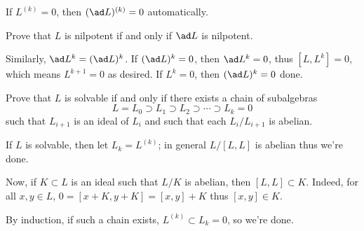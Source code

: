 \documentclass[11pt, headheight=30pt]{scrartcl}
\begin{document}
If $L^{(k)} = 0$, then $(\ad L)^{(k)} = 0$ automatically.

\begin{prob}
    Prove that $L$ is nilpotent if and only if $\ad L$ is nilpotent.
\end{prob}
Similarly, $\ad L^k = (\ad L)^k$. If $(\ad L)^k = 0$, then $\ad L^k = 0$,
thus $[L, L^k] = 0$, which means $L^{k + 1} = 0$ as desired.
If $L^k = 0$, then $(\ad L)^k = 0$ done.

\begin{prob}
    Prove that $L$ is solvable if and only if there exists a chain of subalgebras
    \[
        L = L_0 \supset L_1 \supset L_2 \supset \cdots \supset L_k = 0
    \]
    such that $L_{i+1}$ is an ideal of $L_i$ and such that each $L_i/L_{i+1}$ is abelian.
\end{prob}

If $L$ is solvable, then let $L_k = L^{(k)}$;
in general $L / [L,L]$ is abelian thus we're done.

Now, if $K\subset L$ is an ideal
such that $L / K$ is abelian, then $[L,L]\subset K$.
Indeed, for all $x,y\in L$,
$0 = [x + K, y + K] = [x,y] + K$ thus $[x,y]\in K$.

By induction, if such a chain exists, $L^{(k)}\subset L_k = 0$,
so we're done.
\end{document}
